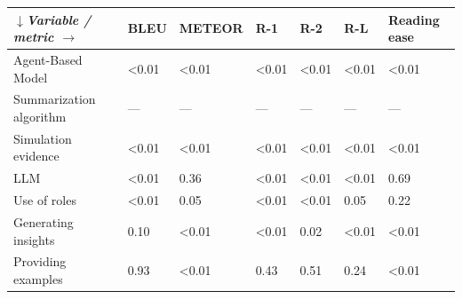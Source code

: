 \begin{tabular}{|l|l|l|l|l|l|l|}
\hline
\textit{$\downarrow$Variable / metric $\rightarrow$} & BLEU & METEOR & R-1 & R-2 & R-L & Reading ease \\
 \hline
 Agent-Based Model & \textless{}0.01 & \textless{}0.01 & \textless{}0.01 & \textless{}0.01 & \textless{}0.01 & \textless{}0.01 \\
 \hline
 Summarization algorithm & — & — & — & — & — & — \\
 \hline
 Simulation evidence & \textless{}0.01 & \textless{}0.01 & \textless{}0.01 & \textless{}0.01 & \textless{}0.01 & \textless{}0.01 \\
 \hline
 LLM & \textless{}0.01 & 0.36 & \textless{}0.01 & \textless{}0.01 & \textless{}0.01 & 0.69 \\
 \hline
 Use of roles & \textless{}0.01 & 0.05 & \textless{}0.01 & \textless{}0.01 & 0.05 & 0.22 \\
 \hline
 Generating insights & 0.10 & \textless{}0.01 & \textless{}0.01 & 0.02 & \textless{}0.01 & \textless{}0.01 \\
 \hline
 Providing examples & 0.93 & \textless{}0.01 & 0.43 & 0.51 & 0.24 & \textless{}0.01 \\
\hline
\end{tabular}
